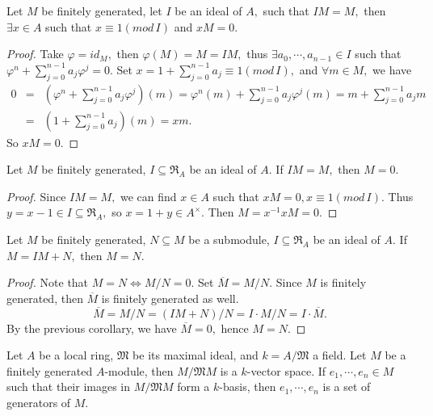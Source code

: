 \begin{cor}
Let $M$ be finitely generated, let $I$ be an ideal of $A,$ such that
$IM=M,$ then $\exists x\in A$ such that $x\equiv 1(mod\,I)$ and
$xM=0.$
\end{cor}
\begin{proof}
Take $\varphi=id_M,$ then $\varphi(M)=M=IM,$ thus $\exists a_0,
\cdots, a_{n-1}\in I$ such that
$\varphi^n+\sum\limits_{j=0}^{n-1}a_j\varphi^j=0.$ Set $x =
1+\sum\limits_{j=0}^{n-1}a_j\equiv 1(mod\,I),$ and $\forall m\in M,$
we have
\begin{eqnarray*}
0 & = & (\varphi^n+\sum\limits_{j=0}^{n-1}a_j\varphi^j)(m) =
\varphi^n(m)+\sum\limits_{j=0}^{n-1}a_j\varphi^j(m) =
m+\sum\limits_{j=0}^{n-1}a_jm \\
& = & (1+\sum\limits_{j=0}^{n-1}a_j)(m) = xm.
\end{eqnarray*}
So $xM=0.$
\end{proof}
\begin{cor}
Let $M$ be finitely generated, $I\subseteq \mathfrak{R}_A$ be an
ideal of $A.$ If $IM=M,$ then $M=0.$
\end{cor}
\begin{proof}
Since $IM=M,$ we can find $x\in A$ such that $xM=0, x\equiv
1(mod\,I).$ Thus $y=x-1\in I\subseteq \mathfrak{R}_A,$ so $x=1+y\in
A^{\times}.$ Then $M=x^{-1}xM=0.$
\end{proof}
\begin{cor}
Let $M$ be finitely generated, $N\subseteq M$ be a submodule, $I
\subseteq \mathfrak{R}_A$ be an ideal of $A.$ If $M=IM+N,$ then
$M=N.$
\end{cor}
\begin{proof}
Note that $M=N\Longleftrightarrow M/N=0.$ Set $\overline{M}=M/N.$
Since $M$ is finitely generated, then $\overline{M}$ is finitely
generated as well.
$$\overline{M} = M/N = (IM+N)/N = I\cdot M/N = I\cdot \overline{M}.$$
By the previous corollary, we have $\overline{M}=0,$ hence $M=N.$
\end{proof}
\begin{prop}
Let $A$ be a local ring, $\mathfrak{M}$ be its maximal ideal, and
$k=A/\mathfrak{M}$ a field. Let $M$ be a finitely generated
$A$-module, then $M/\mathfrak{M}M$ is a $k$-vector space. If
$e_1,\cdots,e_n\in M$ such that their images in $M/\mathfrak{M}M$
form a $k$-basis, then $e_1,\cdots,e_n$ is a set of generators of
$M.$
\end{prop}
